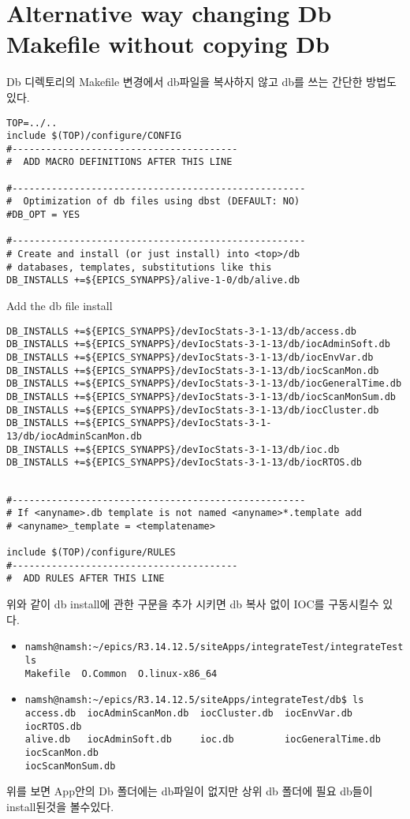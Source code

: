\documentclass[11pt
  , a4paper
  , article
  , oneside
]{memoir}
\begin{document}
\section{Alternative way changing Db Makefile without copying Db}
Db 디렉토리의 Makefile 변경에서 db파일을 복사하지 않고 db를 쓰는 간단한 방법도 있다.
\begin{lstlisting}[style=termstyle]
TOP=../..
include $(TOP)/configure/CONFIG
#----------------------------------------
#  ADD MACRO DEFINITIONS AFTER THIS LINE

#----------------------------------------------------
#  Optimization of db files using dbst (DEFAULT: NO)
#DB_OPT = YES

#----------------------------------------------------
# Create and install (or just install) into <top>/db
# databases, templates, substitutions like this
DB_INSTALLS +=${EPICS_SYNAPPS}/alive-1-0/db/alive.db
\end{lstlisting}
Add the db file install
\begin{lstlisting}[style=termstyle]
DB_INSTALLS +=${EPICS_SYNAPPS}/devIocStats-3-1-13/db/access.db
DB_INSTALLS +=${EPICS_SYNAPPS}/devIocStats-3-1-13/db/iocAdminSoft.db
DB_INSTALLS +=${EPICS_SYNAPPS}/devIocStats-3-1-13/db/iocEnvVar.db
DB_INSTALLS +=${EPICS_SYNAPPS}/devIocStats-3-1-13/db/iocScanMon.db
DB_INSTALLS +=${EPICS_SYNAPPS}/devIocStats-3-1-13/db/iocGeneralTime.db
DB_INSTALLS +=${EPICS_SYNAPPS}/devIocStats-3-1-13/db/iocScanMonSum.db
DB_INSTALLS +=${EPICS_SYNAPPS}/devIocStats-3-1-13/db/iocCluster.db
DB_INSTALLS +=${EPICS_SYNAPPS}/devIocStats-3-1-13/db/iocAdminScanMon.db
DB_INSTALLS +=${EPICS_SYNAPPS}/devIocStats-3-1-13/db/ioc.db
DB_INSTALLS +=${EPICS_SYNAPPS}/devIocStats-3-1-13/db/iocRTOS.db


\end{lstlisting}
\begin{lstlisting}[style=termstyle]
#----------------------------------------------------
# If <anyname>.db template is not named <anyname>*.template add
# <anyname>_template = <templatename>

include $(TOP)/configure/RULES
#----------------------------------------
#  ADD RULES AFTER THIS LINE

\end{lstlisting}
위와 같이 db install에 관한 구문을 추가 시키면 db 복사 없이 IOC를 구동시킬수 있다.
\begin{itemize}
	
	\item 
	\begin{lstlisting}[style=termstyle]
namsh@namsh:~/epics/R3.14.12.5/siteApps/integrateTest/integrateTestApp/Db$ ls
Makefile  O.Common  O.linux-x86_64
\end{lstlisting}
	\item	
	\begin{lstlisting}[style=termstyle]
namsh@namsh:~/epics/R3.14.12.5/siteApps/integrateTest/db$ ls
access.db  iocAdminScanMon.db  iocCluster.db  iocEnvVar.db       iocRTOS.db     
alive.db   iocAdminSoft.db     ioc.db         iocGeneralTime.db  iocScanMon.db
iocScanMonSum.db
\end{lstlisting}
\end{itemize}
위를 보면 App안의 Db 폴더에는 db파일이 없지만 상위 db 폴더에 필요 db들이 install된것을 볼수있다.
\clearpage
\end{document}
